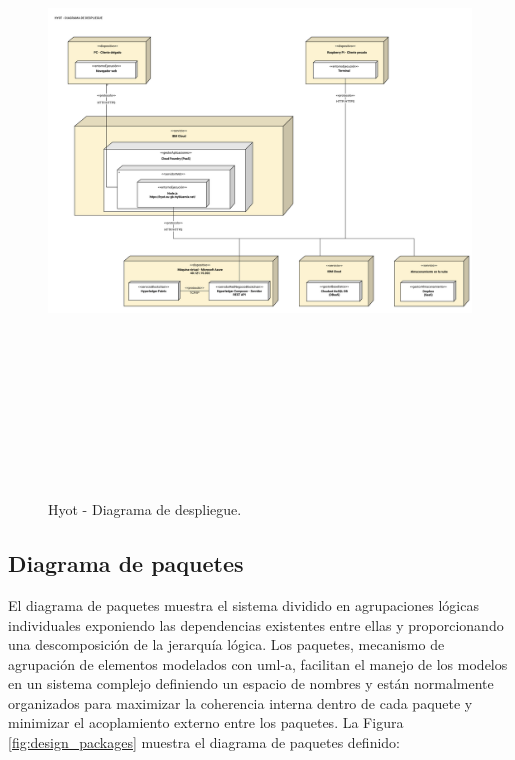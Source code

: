 \documentclass[12pt,a4paper, twoside]{report}
\begin{document}
	\begin{figure}[!ht]   
		\caption{Hyot - Diagrama de despliegue.} 
		\begin{center} 
			\includegraphics[width=17.5cm,height=17cm]{Images/design/d_deployment.png} \\
			\label{fig:design_deployment} 
		\end{center}  
	\end{figure}	

	\subsection{Diagrama de paquetes} %
	
	El diagrama de paquetes muestra el sistema dividido en agrupaciones lógicas individuales exponiendo las dependencias existentes entre ellas y proporcionando una descomposición de la jerarquía lógica. Los paquetes, mecanismo de agrupación de elementos modelados con \gls{uml-a}, facilitan el manejo de los modelos en un sistema complejo definiendo un espacio de nombres y están normalmente organizados para maximizar la coherencia interna dentro de cada paquete y minimizar el acoplamiento externo entre los paquetes. La Figura \ref{fig:design_packages} muestra el diagrama de paquetes definido:
	
\end{document}
